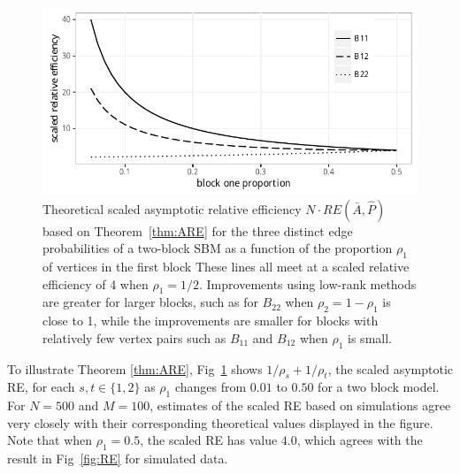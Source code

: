 \documentclass[10pt,letterpaper]{article}
\begin{document}
\begin{figure}[!t]
\centering
\includegraphics[width=1\textwidth]{Rho.pdf}
\caption{Theoretical scaled asymptotic relative efficiency $N\cdot RE(\bar{A},\hat{P})$ based on Theorem~\ref{thm:ARE} for the three distinct edge probabilities of a two-block SBM as a function of the proportion $\rho_1$ of vertices in the first block
These lines all meet at a scaled relative efficiency of 4 when $\rho_1=1/2$.
Improvements using low-rank methods are greater for larger blocks, such as for $B_{22}$ when $\rho_2=1-\rho_1$ is close to 1, while the improvements are smaller for blocks with relatively few vertex pairs such as $B_{11}$ and $B_{12}$ when $\rho_1$ is small.
}
\label{fig:RErho}
\end{figure}



To illustrate Theorem \ref{thm:ARE}, Fig~\ref{fig:RErho} shows $1/\rho_s + 1/\rho_t$, the scaled asymptotic RE, for each $s,t\in\{1,2\}$ as $\rho_1$ changes from $0.01$ to $0.50$ for a two block model. 
For $N=500$ and $M=100$, estimates of the scaled RE based on simulations agree very closely with their corresponding theoretical values displayed in the figure. Note that when $\rho_1 = 0.5$, the scaled RE has value $4.0$, which agrees with the result in Fig~\ref{fig:RE} for simulated data.
\end{document}

